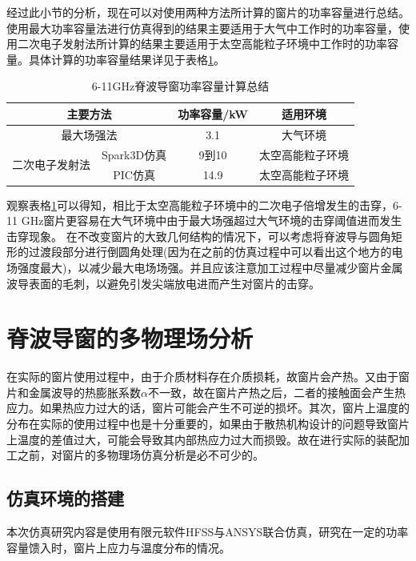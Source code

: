 \documentclass[master]{thesis-uestc}
\begin{document}
经过此小节的分析，现在可以对使用两种方法所计算的窗片的功率容量进行总结。使用最大功率容量法进行仿真得到的结果主要适用于大气中工作时的功率容量，使用二次电子发射法所计算的结果主要适用于太空高能粒子环境中工作时的功率容量。具体计算的功率容量结果详见于表格\ref{tab:X频段脊波导窗功率容量}。

\begin{table}[!htb]
    \centering
    \caption{6-11GHz脊波导窗功率容量计算总结}
    \label{tab:X频段脊波导窗功率容量}
    \begin{tabular}{@{}cccc@{}}
    \toprule[1.5pt]
    \multicolumn{2}{c}{主要方法}             & 功率容量/kW & 适用环境 \\ \midrule
    \multicolumn{2}{c}{最大场强法}            & 3.1     & 大气环境 \\
    \multirow{2}{*}{二次电子发射法} & Spark3D仿真 & 9到10    & 太空高能粒子环境 \\
                             & PIC仿真     & 14.9    & 太空高能粒子环境 \\ \bottomrule[1.5pt]
    \end{tabular}
\end{table}

观察表格\ref{tab:X频段脊波导窗功率容量}可以得知，相比于太空高能粒子环境中的二次电子倍增发生的击穿，6-11 GHz窗片更容易在大气环境中由于最大场强超过大气环境的击穿阈值进而发生击穿现象。
在不改变窗片的大致几何结构的情况下，可以考虑将脊波导与圆角矩形的过渡段部分进行倒圆角处理(因为在之前的仿真过程中可以看出这个地方的电场强度最大)，以减少最大电场场强。并且应该注意加工过程中尽量减少窗片金属波导表面的毛刺，以避免引发尖端放电进而产生对窗片的击穿。

\section{脊波导窗的多物理场分析}
在实际的窗片使用过程中，由于介质材料存在介质损耗，故窗片会产热。又由于窗片和金属波导的热膨胀系数\(\alpha\)不一致，故在窗片产热之后，二者的接触面会产生热应力。如果热应力过大的话，窗片可能会产生不可逆的损坏。其次，窗片上温度的分布在实际的使用过程中也是十分重要的，如果由于散热机构设计的问题导致窗片上温度的差值过大，可能会导致其内部热应力过大而损毁。故在进行实际的装配加工之前，对窗片的多物理场仿真分析是必不可少的。
\subsection{仿真环境的搭建}
本次仿真研究内容是使用有限元软件HFSS与ANSYS联合仿真，研究在一定的功率容量馈入时，窗片上应力与温度分布的情况。
\end{document}
